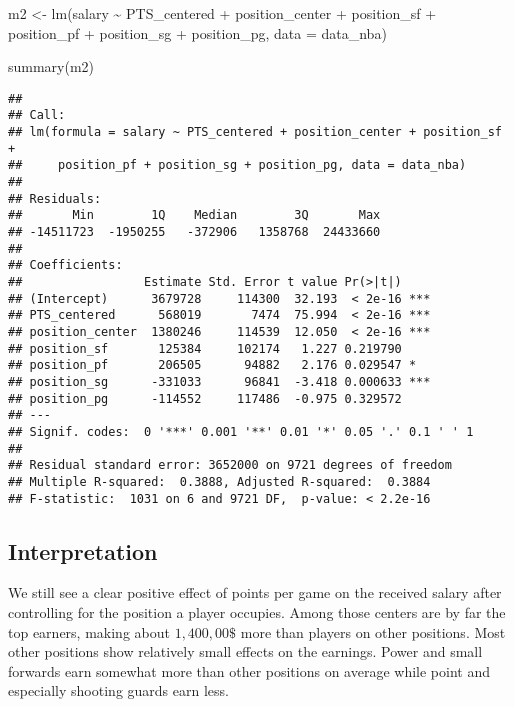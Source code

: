 \documentclass[
]{book}
\newenvironment{Shaded}{\begin{snugshade}}{\end{snugshade}}
\newcommand{\AttributeTok}[1]{\textcolor[rgb]{0.77,0.63,0.00}{#1}}
\newcommand{\FunctionTok}[1]{\textcolor[rgb]{0.00,0.00,0.00}{#1}}
\newcommand{\NormalTok}[1]{#1}
\newcommand{\OtherTok}[1]{\textcolor[rgb]{0.56,0.35,0.01}{#1}}
\newcommand{\SpecialCharTok}[1]{\textcolor[rgb]{0.00,0.00,0.00}{#1}}
\begin{document}
\begin{Shaded}
\begin{Highlighting}[]
\NormalTok{m2 }\OtherTok{\textless{}{-}} \FunctionTok{lm}\NormalTok{(salary }\SpecialCharTok{\textasciitilde{}}\NormalTok{ PTS\_centered }\SpecialCharTok{+}\NormalTok{ position\_center }\SpecialCharTok{+}\NormalTok{ position\_sf }\SpecialCharTok{+}\NormalTok{  position\_pf }\SpecialCharTok{+}\NormalTok{ position\_sg }\SpecialCharTok{+}\NormalTok{ position\_pg, }\AttributeTok{data =}\NormalTok{ data\_nba)}

\FunctionTok{summary}\NormalTok{(m2)}
\end{Highlighting}
\end{Shaded}

\begin{verbatim}
## 
## Call:
## lm(formula = salary ~ PTS_centered + position_center + position_sf + 
##     position_pf + position_sg + position_pg, data = data_nba)
## 
## Residuals:
##       Min        1Q    Median        3Q       Max 
## -14511723  -1950255   -372906   1358768  24433660 
## 
## Coefficients:
##                 Estimate Std. Error t value Pr(>|t|)    
## (Intercept)      3679728     114300  32.193  < 2e-16 ***
## PTS_centered      568019       7474  75.994  < 2e-16 ***
## position_center  1380246     114539  12.050  < 2e-16 ***
## position_sf       125384     102174   1.227 0.219790    
## position_pf       206505      94882   2.176 0.029547 *  
## position_sg      -331033      96841  -3.418 0.000633 ***
## position_pg      -114552     117486  -0.975 0.329572    
## ---
## Signif. codes:  0 '***' 0.001 '**' 0.01 '*' 0.05 '.' 0.1 ' ' 1
## 
## Residual standard error: 3652000 on 9721 degrees of freedom
## Multiple R-squared:  0.3888, Adjusted R-squared:  0.3884 
## F-statistic:  1031 on 6 and 9721 DF,  p-value: < 2.2e-16
\end{verbatim}

\hypertarget{interpretation-2}{%
\subsection{Interpretation}\label{interpretation-2}}

We still see a clear positive effect of points per game on the received salary
after controlling for the position a player occupies. Among those centers are by
far the top earners, making about \(1,400,00\$\) more than players on other
positions. Most other positions show relatively small effects on the earnings.
Power and small forwards earn somewhat more than other positions on average
while point and especially shooting guards earn less.
\end{document}
